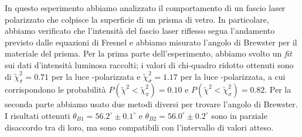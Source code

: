 In questo esperimento abbiamo analizzato il comportamento di un fascio laser polarizzato
che colpisce la superficie di un prisma di vetro.
In particolare, abbiamo verificato che l’intensità del fascio laser riflesso segua l’andamento
previsto dalle equazioni di Fresnel e abbiamo misurato l'angolo di Brewster per il materiale del prisma.
Per la prima parte dell'esperimento, abbiamo svolto un \emph{fit} sui dati d'intensità luminosa raccolti; i valori di chi-quadro ridotto
ottenuti sono di $\tilde \chi^2_\pi = 0.71$ per la luce \pi-polarizzata e
$\tilde \chi^2_\sigma = 1.17$ per la luce \sigma-polarizzata, a cui corrispondono le probabilità $P(\tilde \chi^2 < \tilde \chi^2_\pi) = 0.10$ e $P(\tilde \chi^2 < \tilde \chi^2_\sigma) = 0.82$.
Per la seconda parte abbiamo usato due metodi diversi per trovare l'angolo di Brewster.
I risultati ottenuti $\theta_{B1} = 56.2^\circ \pm 0.1^\circ$ e $\theta_{B2} = 56.0^\circ \pm 0.2^\circ$ sono in parziale disaccordo tra di loro,
ma sono compatibili con l'intervallo di valori atteso.
\endinput
